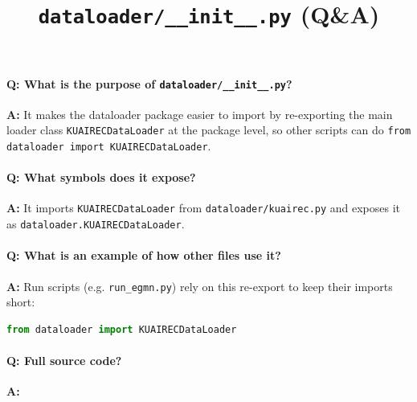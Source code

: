 \documentclass[11pt]{article}
\title{\texttt{dataloader/\_\_init\_\_.py} (Q\&A)}
\author{}
\date{}
\begin{document}
\maketitle

\paragraph{Q: What is the purpose of \texttt{dataloader/\_\_init\_\_.py}?}
\textbf{A:} It makes the dataloader package easier to import by re-exporting the main loader class \lstinline|KUAIRECDataLoader| at the package level, so other scripts can do \lstinline|from dataloader import KUAIRECDataLoader|.

\paragraph{Q: What symbols does it expose?}
\textbf{A:} It imports \lstinline|KUAIRECDataLoader| from \lstinline|dataloader/kuairec.py| and exposes it as \lstinline|dataloader.KUAIRECDataLoader|.

\paragraph{Q: What is an example of how other files use it?}
\textbf{A:} Run scripts (e.g. \lstinline|run_egmn.py|) rely on this re-export to keep their imports short:
\begin{lstlisting}[language=Python]
from dataloader import KUAIRECDataLoader
\end{lstlisting}

\paragraph{Q: Full source code?}
\textbf{A:}

\end{document}
